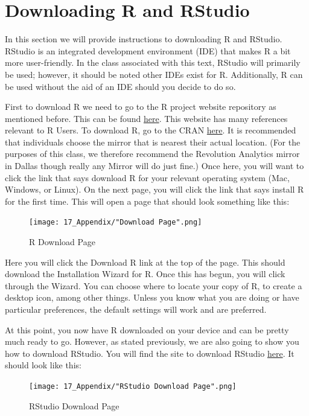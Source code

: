 \documentclass[11pt,openany]{book}\usepackage[]{graphicx}\usepackage[]{color}
\begin{document}
{\section{Downloading R and RStudio}

In this section we will provide instructions to downloading R and RStudio. RStudio is an integrated development environment (IDE) that makes R a bit more user-friendly. In the class associated with this text, RStudio will primarily be used; however, it should be noted other IDEs exist for R. Additionally, R can be used without the aid of an IDE should you decide to do so. 

First to download R we need to go to the R project website repository as mentioned before. This can be found \href{https://www.r-project.org/}{here}. This website has many references relevant to R Users. To download R, go to the CRAN \href{https://cran.r-project.org/mirrors.html}{here}. It is recommended that individuals choose the mirror that is nearest their actual location. (For the purposes of this class, we therefore recommend the Revolution Analytics mirror in Dallas though really any Mirror will do just fine.) Once here, you will want to click the link that says download R for your relevant operating system (Mac, Windows, or Linux). On the next page, you will click the link that says install R for the first time. This will open a page that should look something like this:

\begin{figure}[h]
\centering
\texttt{[image: 17\_Appendix/"Download Page".png]}
\caption{R Download Page
\label{fig:rdp}}
\end{figure}

Here you will click the Download R link at the top of the page. This should download the Installation Wizard for R. Once this has begun, you will click through the Wizard. You can choose where to locate your copy of R, to create a desktop icon, among other things. Unless you know what you are doing or have particular preferences, the default settings will work and are preferred. 

At this point, you now have R downloaded on your device and can be pretty much ready to go. However, as stated previously, we are also going to show you how to download RStudio. You will find the site to download RStudio \href{https://www.rstudio.com/products/rstudio/download2/}{here}. It should look like this: 

\begin{figure}[h!]
\centering
\texttt{[image: 17\_Appendix/"RStudio Download Page".png]}
\caption{RStudio Download Page 
\label{fig:rsdp}}
\end{figure}

}
\end{document}

